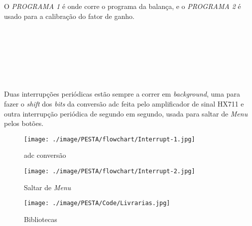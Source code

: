 O \textit{PROGRAMA 1} é onde corre o programa da balança, e o \textit{PROGRAMA 2} é usado para a calibração do fator de ganho.
\\
\\
\\
\\
\\
\\
\\
\\
Duas interrupções periódicas estão sempre a correr em \textit{background}, uma para fazer o \textit{shift} dos \textit{bits} da conversão \acs{adc} feita pelo amplificador de sinal HX711 e outra interrupção periódica de segundo em segundo, usada para saltar de \textit{Menu} pelos botões.
\\
\begin{minipage}{\linewidth}
	\begin{minipage}{.5\linewidth}
		\begin{figure}[H]
			\centering
			\texttt{[image: ./image/PESTA/flowchart/Interrupt-1.jpg]}
			\caption{\acs{adc} conversão}
			\label{Interrupt_1}
		\end{figure}
	\end{minipage}
	\begin{minipage}{.5\linewidth}
		\begin{figure}[H]
			\centering
			\texttt{[image: ./image/PESTA/flowchart/Interrupt-2.jpg]}
			\caption{Saltar de \textit{Menu}}
			\label{Interrupt_2}
		\end{figure}
	\end{minipage}
\end{minipage}
\begin{minipage}{.40\linewidth}
	\begin{figure}[H]
		\flushleft
		\captionsetup{justification=raggedright,singlelinecheck=false}
		\texttt{[image: ./image/PESTA/Code/Livrarias.jpg]}
		\caption{Bibliotecas}
		\label{Bibliotecas}
	\end{figure}
\end{minipage}
